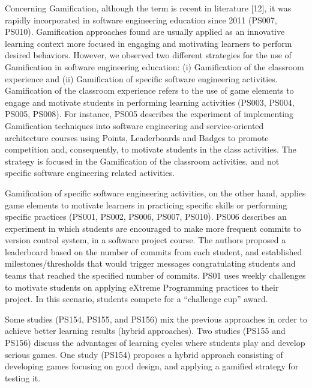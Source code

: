 Concerning Gamification, although the term is recent in literature \citep{Deterding:2011}[12], it was rapidly incorporated in software engineering education since 2011 (PS007, PS010). Gamification approaches found are usually applied as an innovative learning context more focused in engaging and motivating learners to perform desired behaviors. However, we observed two different strategies for the use of Gamification in software engineering education: (i) Gamification of the classroom experience and (ii) Gamification of specific software engineering activities. Gamification of the classroom experience refers to the use of game elements to engage and motivate students in performing learning activities (PS003, PS004, PS005, PS008). For instance, PS005 describes the experiment of implementing Gamification techniques into software engineering and service-oriented architecture courses using Points, Leaderboards and Badges to promote competition and, consequently, to motivate students in the class activities. The strategy is focused in the Gamification of the classroom activities, and not specific software engineering related activities. 

Gamification of specific software engineering activities, on the other hand, applies game elements to motivate learners in practicing specific skills or performing specific practices (PS001, PS002, PS006, PS007, PS010). PS006 describes an experiment in which students are encouraged to make more frequent commits to version control system, in a software project course. The authors proposed a leaderboard based on the number of commits from each student, and established milestones/thresholds that would trigger messages congratulating students and teams that reached the specified number of commits. PS01 uses weekly challenges to motivate students on applying eXtreme Programming practices to their project. In this scenario, students compete for a “challenge cup” award.

Some studies (PS154, PS155, and PS156) mix the previous approaches in order to achieve better learning results (hybrid approaches). Two studies (PS155 and PS156) discuss the advantages of learning cycles where students play and develop serious games. One study (PS154) proposes a hybrid approach consisting of developing games focusing on good design, and applying a gamified strategy for testing it.

